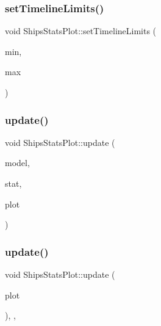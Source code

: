 \mbox{\label{class_ships_stats_plot_a7892421b2d2b67fd741e6b4bb8462380}} 
\subsubsection{\texorpdfstring{setTimelineLimits()}{setTimelineLimits()}}
{\footnotesize\ttfamily void Ships\+Stats\+Plot\+::set\+Timeline\+Limits (\begin{DoxyParamCaption}\item[{double}]{min,  }\item[{double}]{max }\end{DoxyParamCaption})\hspace{0.3cm}{\ttfamily [inline]}}

\mbox{\label{class_ships_stats_plot_a0d69f5c81e3c90a47f93a6ae04a64418}} 
\subsubsection{\texorpdfstring{update()}{update()}\hspace{0.1cm}{\footnotesize\ttfamily [1/2]}}
{\footnotesize\ttfamily void Ships\+Stats\+Plot\+::update (\begin{DoxyParamCaption}\item[{\mbox{\hyperlink{class_displace_model}{Displace\+Model}} $\ast$}]{model,  }\item[{\mbox{\hyperlink{namespacedisplace_1_1plot_a8c50b4d54cafba744b1b5b51b53407e0}{displace\+::plot\+::\+Ships\+Stat}}}]{stat,  }\item[{\mbox{\hyperlink{class_q_custom_plot}{Q\+Custom\+Plot}} $\ast$}]{plot }\end{DoxyParamCaption})}

\mbox{\label{class_ships_stats_plot_a1e9a41757c9d114a939318d7582c060c}} 
\subsubsection{\texorpdfstring{update()}{update()}\hspace{0.1cm}{\footnotesize\ttfamily [2/2]}}
{\footnotesize\ttfamily void Ships\+Stats\+Plot\+::update (\begin{DoxyParamCaption}\item[{\mbox{\hyperlink{class_q_custom_plot}{Q\+Custom\+Plot}} $\ast$}]{plot }\end{DoxyParamCaption})\hspace{0.3cm}{\ttfamily [override]}, {\ttfamily [protected]}, {\ttfamily [virtual]}}



